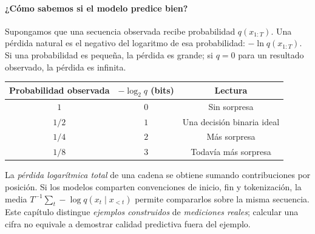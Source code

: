 \paragraph{¿Cómo sabemos si el modelo predice bien?}
Supongamos que una secuencia observada recibe probabilidad $q(x_{1:T})$. Una pérdida natural es el negativo del logaritmo de esa probabilidad: $-\ln q(x_{1:T})$. Si una probabilidad es pequeña, la pérdida es grande; si $q=0$ para un resultado observado, la pérdida es infinita.
\begin{center}
\begin{tabular}{c|c|c}\toprule
Probabilidad observada & $-\log_2q$ (bits) & Lectura\\\midrule
$1$ & $0$ & Sin sorpresa\\
$1/2$ & $1$ & Una decisión binaria ideal\\
$1/4$ & $2$ & Más sorpresa\\
$1/8$ & $3$ & Todavía más sorpresa\\\bottomrule
\end{tabular}
\end{center}
La \emph{pérdida logarítmica total} de una cadena se obtiene sumando contribuciones por posición. Si los modelos comparten convenciones de inicio, fin y tokenización, la media $T^{-1}\sum_t-\log q(x_t\mid x_{<t})$ permite compararlos sobre la misma secuencia. Este capítulo distingue \emph{ejemplos construidos} de \emph{mediciones reales}; calcular una cifra no equivale a demostrar calidad predictiva fuera del ejemplo.


